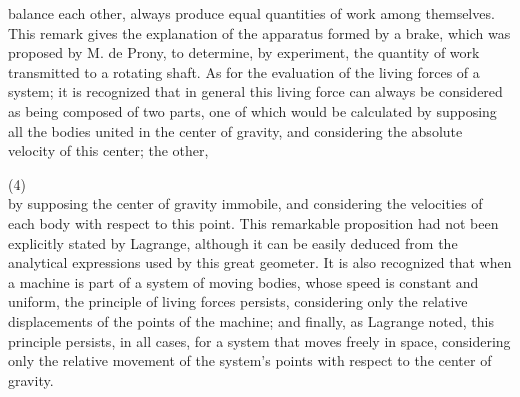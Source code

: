 \documentclass{book}
\begin{document}
balance each other, always produce equal quantities of work among themselves. This remark gives the explanation of the apparatus formed by a brake, which was proposed by M. de Prony, to determine, by experiment, the quantity of work transmitted to a rotating shaft. As for the evaluation of the living forces of a system; it is recognized that in general this living force can always be considered as being composed of two parts, one of which would be calculated by supposing all the bodies united in the center of gravity, and considering the absolute velocity of this center; the other, 

\newpage
(4)\\
by supposing the center of gravity immobile, and considering the velocities of each body with respect to this point.
This remarkable proposition had not been explicitly stated by Lagrange, although it can be easily deduced from the analytical expressions used by this great geometer. It is also recognized that when a machine is part of a system of moving bodies, whose speed is constant and uniform, the principle of living forces persists, considering only the relative displacements of the points of the machine; and finally, as Lagrange noted, this principle persists, in all cases, for a system that moves freely in space, considering only the relative movement of the system's points with respect to the center of gravity.
\end{document}

